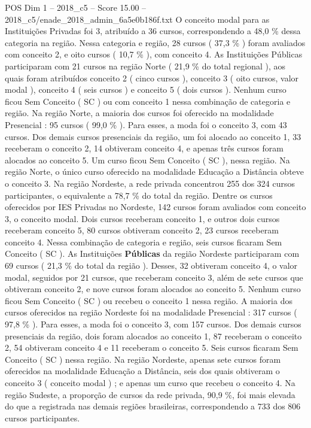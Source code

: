 \begin{textsample}{POS Dim 1 – 2018\_c5 – Score 15.00 – 2018\_c5/enade\_2018\_admin\_6a5e0b186f.txt}
O conceito modal para as Instituições Privadas foi 3, atribuído a 36 cursos, correspondendo a 48,0 \% dessa categoria na região.
Nessa categoria e região, 28 cursos ( 37,3 \% ) foram avaliados com conceito 2, e oito cursos ( 10,7 \% ), com conceito 4.
As Instituições Públicas participaram com 21 cursos na região Norte ( 21,9 \% do total regional ), aos quais foram atribuídos conceito 2 ( cinco cursos ), conceito 3 ( oito cursos, valor modal ), conceito 4 ( seis cursos ) e conceito 5 ( dois cursos ).
Nenhum curso ficou Sem Conceito ( SC ) ou com conceito 1 nessa combinação de categoria e região.
Na região Norte, a maioria dos cursos foi oferecido na modalidade Presencial : 95 cursos ( 99,0 \% ).
Para esses, a moda foi o conceito 3, com 43 cursos.
Dos demais cursos presenciais da região, um foi alocado ao conceito 1, 33 receberam o conceito 2, 14 obtiveram conceito 4, e apenas três cursos foram alocados ao conceito 5.
Um curso ficou Sem Conceito ( SC ), nessa região.
Na região Norte, o único curso oferecido na modalidade Educação a Distância obteve o conceito 3.
Na região Nordeste, a rede privada concentrou 255 dos 324 cursos participantes, o equivalente a 78,7 \% do total da região.
Dentre os cursos oferecidos por IES Privadas no Nordeste, 142 cursos foram avaliados com conceito 3, o conceito modal.
Dois cursos receberam conceito 1, e outros dois cursos receberam conceito 5, 80 cursos obtiveram conceito 2, 23 cursos receberam conceito 4.
Nessa combinação de categoria e região, seis cursos ficaram Sem Conceito ( SC ).
As Instituições \textbf{Públicas} da região Nordeste participaram com 69 cursos ( 21,3 \% do total da região ).
Desses, 32 obtiveram conceito 4, o valor modal, seguidos por 21 cursos, que receberam conceito 3, além de sete cursos que obtiveram conceito 2, e nove cursos foram alocados ao conceito 5.
Nenhum curso ficou Sem Conceito ( SC ) ou recebeu o conceito 1 nessa região.
A maioria dos cursos oferecidos na região Nordeste foi na modalidade Presencial : 317 cursos ( 97,8 \% ).
Para esses, a moda foi o conceito 3, com 157 cursos.
Dos demais cursos presenciais da região, dois foram alocados ao conceito 1, 87 receberam o conceito 2, 54 obtiveram conceito 4 e 11 receberam o conceito 5.
Seis cursos ficaram Sem Conceito ( SC ) nessa região.
Na região Nordeste, apenas sete cursos foram oferecidos na modalidade Educação a Distância, seis dos quais obtiveram o conceito 3 ( conceito modal ) ; e apenas um curso que recebeu o conceito 4.
Na região Sudeste, a proporção de cursos da rede privada, 90,9 \%, foi mais elevada do que a registrada nas demais regiões brasileiras, correspondendo a 733 dos 806 cursos participantes.

\end{textsample}
